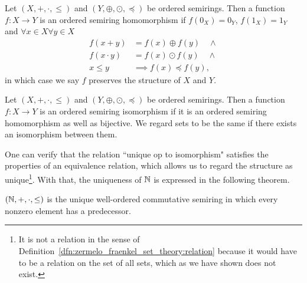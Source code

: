 \documentclass[../main.tex]{subfiles}
\begin{document}
\begin{definition}\label{dfn:the_natural_numbers_integers_and_rational_numbers:ordered_semiring_homomorphism}
        Let $(X,+,\cdot,\leq)$ and \linebreak$(Y,\oplus,\odot,\preceq)$ be ordered semirings. Then a function $f:X\to Y$ is an ordered semiring homomorphism if $f(0_X)=0_Y$, $f(1_X)=1_Y$ and $\forall x\in X\forall y\in X$
    \begin{align*}
        f(x+y) & =f(x)\oplus f(y)\quad\land \\
        f(x\cdot y) & =f(x)\odot f(y)\quad\land \\
        x\leq y & \implies f(x)\preceq f(y),
    \end{align*}
    in which case we say $f$ preserves the structure of $X$ and $Y$.
\end{definition}
\begin{definition}
    Let $(X,+,\cdot,\leq)$ and \linebreak$(Y,\oplus,\odot,\preceq)$ be ordered semirings. Then a function $f:X\to Y$ is an ordered semiring isomorphism if it is an ordered semiring homomorphism as well as bijective. We regard sets to be the same if there exists an isomorphism between them.
\end{definition}
One can verify that the relation ``unique op to isomorphism" satisfies the properties of an equivalence relation, which allows us to regard the structure as unique\footnote{It is not a relation in the sense of Definition~\ref{dfn:zermelo_fraenkel_set_theory:relation} because it would have to be a relation on the set of all sets, which as we have shown does not exist.}. With that, the uniqueness of $\mathbb{N}$ is expressed in the following theorem.
\begin{theorem}\label{thm:the_natural_numbers_integers_and_rational_numbers:uniqueness_N}
    $(\mathbb{N},+,\cdot,\leq)$ is the unique well-ordered commutative semiring in which every nonzero element has a predecessor.
\end{theorem}
\end{document}
